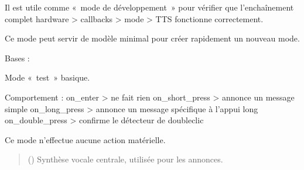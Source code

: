 \documentclass[letterpaper,10pt,french]{sphinxmanual}
\begin{document}
\sphinxAtStartPar
Il est utile comme « mode de développement » pour vérifier que
l’enchaînement complet hardware \sphinxhyphen{}\textgreater{} callbacks \sphinxhyphen{}\textgreater{} mode \sphinxhyphen{}\textgreater{} TTS
fonctionne correctement.

\sphinxAtStartPar
Ce mode peut servir de modèle minimal pour créer rapidement
un nouveau mode.

\begin{fulllineitems}
\label{\detokenize{api/modes:modes.mode_dummy.ModeDummy}}
\pysigstartsignatures
\pysiglinewithargsret
{}
{}
{}
\pysigstopsignatures
\sphinxAtStartPar
Bases : {\hyperref[\detokenize{api/core:core.mode_base.Mode}]{}}

\sphinxAtStartPar
Mode « test » basique.

\sphinxAtStartPar
Comportement :
\sphinxhyphen{} on\_enter       \sphinxhyphen{}\textgreater{} ne fait rien
\sphinxhyphen{} on\_short\_press \sphinxhyphen{}\textgreater{} annonce un message simple
\sphinxhyphen{} on\_long\_press  \sphinxhyphen{}\textgreater{} annonce un message spécifique à l’appui long
\sphinxhyphen{} on\_double\_press \sphinxhyphen{}\textgreater{} confirme le détecteur de double\sphinxhyphen{}clic

\sphinxAtStartPar
Ce mode n’effectue aucune action matérielle.

\begin{fulllineitems}
\label{\detokenize{api/modes:modes.mode_dummy.ModeDummy.__init__}}
\pysigstartsignatures
\pysiglinewithargsret
{}
{}
{}
\pysigstopsignatures\begin{quote}\begin{description}
\sphinxAtStartPar
{} ({\hyperref[\detokenize{api/core:core.speaker.Speaker}]{}}) \textendash{} Synthèse vocale centrale, utilisée pour les annonces.


\end{description}
\end{quote}
\end{fulllineitems}
\end{fulllineitems}
\end{document}
